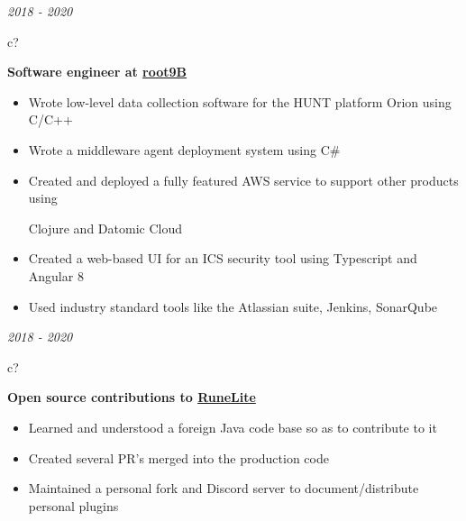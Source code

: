 \documentclass[12pt,a4paper,sans]{moderncv} %
\begin{document}
\textit{2018 - 2020}
\hspace{1 mm}
\begin{tabular}{c?}
 \\
\end{tabular}
 \hspace{1 mm}
 \textbf{Software engineer at \href{https://www.root9b.com/}{root9B}}

 \vspace{-1 mm}
 \begin{itemize}
 \addtolength{\itemindent}{31.7 mm}
 \vspace{2 pt}
 \item{Wrote low-level data collection software for the HUNT platform Orion using C/C++}
 \item{Wrote a middleware agent deployment system using C\#}
 \item{Created and deployed a fully featured AWS service to support other products using 
 
 \hspace{30.5 mm} Clojure and Datomic Cloud}
 \item{Created a web-based UI for an ICS security tool using Typescript and Angular 8}
 \item{Used industry standard tools like the Atlassian suite, Jenkins, SonarQube}
 \end{itemize}
 
\textit{2018 - 2020}
\hspace{1 mm}
\begin{tabular}{c?}
 \\
\end{tabular}
 \hspace{1 mm}
 \textbf{Open source contributions to \href{https://runelite.net}{RuneLite}}

 \vspace{-1 mm}
 \begin{itemize}
 \addtolength{\itemindent}{31.7 mm}
 \vspace{2 pt}
 \item{Learned and understood a foreign Java code base so as to contribute to it}
 \item{Created several PR's merged into the production code}
 \item{Maintained a personal fork and Discord server to document/distribute personal plugins}
 \end{itemize}
 
\end{document}
